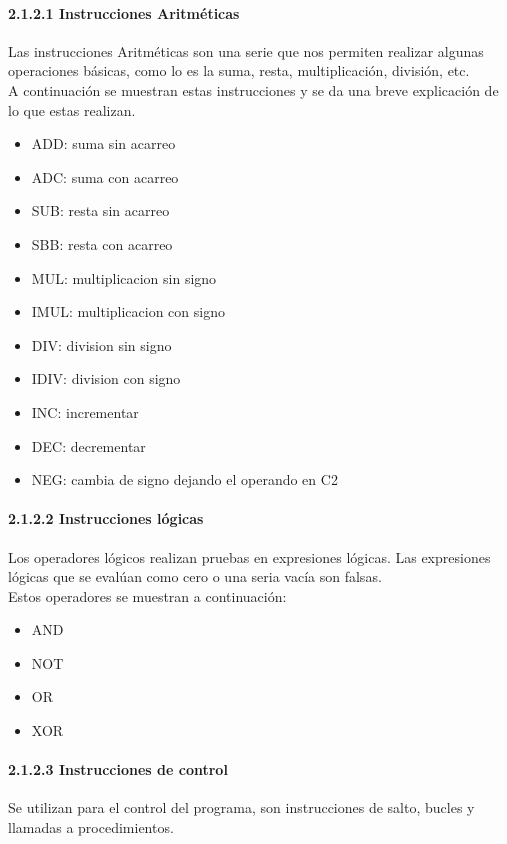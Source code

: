 \documentclass[12pt,a4paper]{article}
\begin{document}
   \paragraph{2.1.2.1 Instrucciones Aritméticas}
   Las instrucciones Aritméticas son una serie que nos permiten realizar algunas operaciones básicas, como lo es la suma, resta, multiplicación, división, etc.\\
     A continuación se muestran estas instrucciones y se da una breve explicación de lo que estas realizan.
     
     \begin{itemize}
     	\item ADD: suma sin acarreo
     	 \item ADC: suma con acarreo
     	 \item SUB: resta sin acarreo
     	 \item SBB: resta con acarreo
     	 \item MUL: multiplicacion sin signo
     	 \item IMUL: multiplicacion con signo
     	 \item DIV:  division sin signo
     	 \item IDIV: division con signo
     	 \item INC: incrementar
     	 \item DEC: decrementar
     	 \item NEG: cambia de signo dejando el operando en C2
     \end{itemize}
   
  \paragraph{2.1.2.2 Instrucciones lógicas}
  Los operadores lógicos realizan pruebas en expresiones lógicas. Las expresiones lógicas que se evalúan como cero o una seria vacía son falsas. \\
  Estos operadores se muestran a continuación:
  \begin{itemize}
  		\item AND
  		\item NOT
  		\item OR
  		\item XOR
  \end{itemize}
   
\paragraph{2.1.2.3 Instrucciones de control}
  Se utilizan para el control del programa, son instrucciones de salto, bucles y llamadas a procedimientos.\\
  
\end{document}
